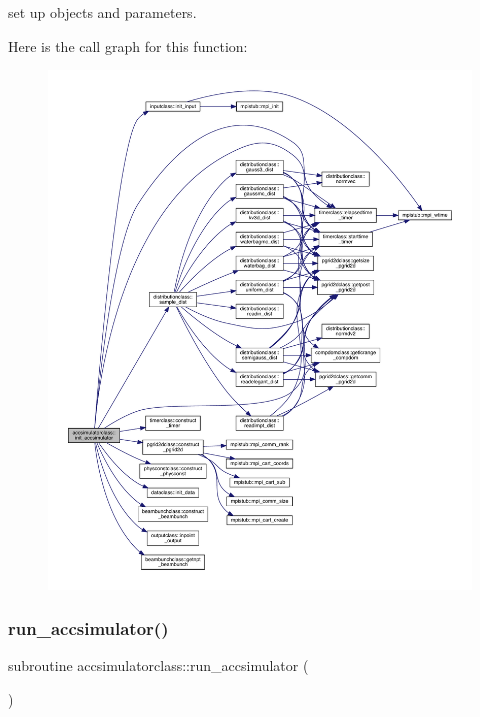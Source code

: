 set up objects and parameters. 

Here is the call graph for this function\+:\nopagebreak
\begin{figure}[H]
\begin{center}
\leavevmode
\includegraphics[width=350pt]{namespaceaccsimulatorclass_a6a90186281758191cfa3ef4fc9c54078_cgraph}
\end{center}
\end{figure}
\mbox{\label{namespaceaccsimulatorclass_acbe26eeaf1cb4076384b90e1016785f0}} 
\subsubsection{\texorpdfstring{run\_accsimulator()}{run\_accsimulator()}}
{\footnotesize\ttfamily subroutine accsimulatorclass\+::run\+\_\+accsimulator (\begin{DoxyParamCaption}{ }\end{DoxyParamCaption})}



